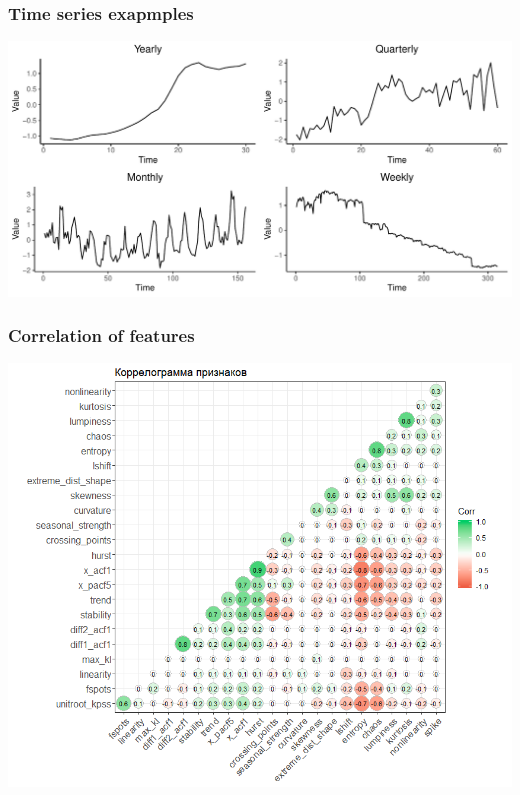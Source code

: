 \begin{frame}
\frametitle{Time series exapmples}

\begin{center}
\includegraphics[width = \linewidth]{slides/time_series.pdf}
\end{center}
\end{frame}

\begin{frame}
\frametitle{Correlation of features}

\begin{center}
\includegraphics[width = 0.8\linewidth]{slides/corr.png}
\end{center}
\end{frame}

